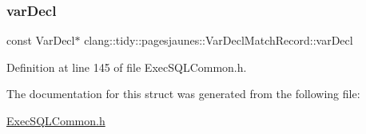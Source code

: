 \subsubsection{\texorpdfstring{var\+Decl}{varDecl}}
{\footnotesize\ttfamily const Var\+Decl$\ast$ clang\+::tidy\+::pagesjaunes\+::\+Var\+Decl\+Match\+Record\+::var\+Decl}



Definition at line 145 of file Exec\+S\+Q\+L\+Common.\+h.



The documentation for this struct was generated from the following file\+:\begin{DoxyCompactItemize}
\item 
\hyperlink{_exec_s_q_l_common_8h}{Exec\+S\+Q\+L\+Common.\+h}\end{DoxyCompactItemize}
